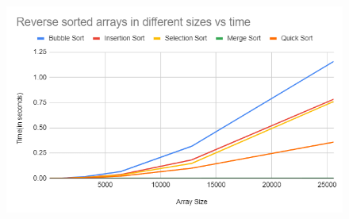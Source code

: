 \documentclass{report}
\begin{document}
\begin{figure}[H]
\centering
\includegraphics[scale=0.8]{reversesorted.png}

\end{figure}
\end{document}
